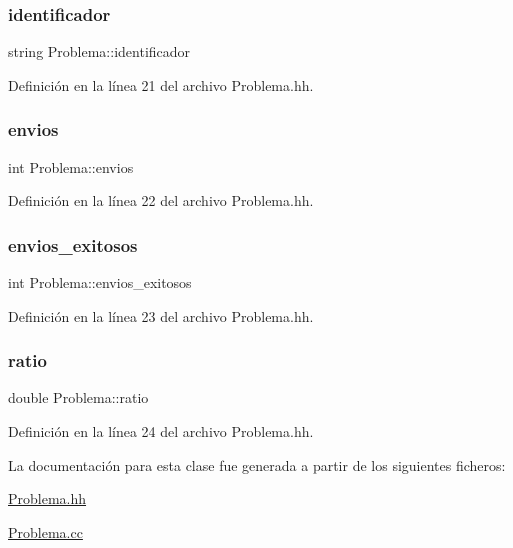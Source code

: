 \subsubsection{\texorpdfstring{identificador}{identificador}}
{\footnotesize\ttfamily string Problema\+::identificador\hspace{0.3cm}{\ttfamily [private]}}



Definición en la línea 21 del archivo Problema.\+hh.

\mbox{\label{class_problema_aaef8dcb723fa829a052517a00aed003e}} 
\subsubsection{\texorpdfstring{envios}{envios}}
{\footnotesize\ttfamily int Problema\+::envios\hspace{0.3cm}{\ttfamily [private]}}



Definición en la línea 22 del archivo Problema.\+hh.

\mbox{\label{class_problema_ad8f0dfd65c2673395ad72ae9817cb7ae}} 
\subsubsection{\texorpdfstring{envios\+\_\+exitosos}{envios\_exitosos}}
{\footnotesize\ttfamily int Problema\+::envios\+\_\+exitosos\hspace{0.3cm}{\ttfamily [private]}}



Definición en la línea 23 del archivo Problema.\+hh.

\mbox{\label{class_problema_acc3d2ce24418ad68650108de4b603d99}} 
\subsubsection{\texorpdfstring{ratio}{ratio}}
{\footnotesize\ttfamily double Problema\+::ratio\hspace{0.3cm}{\ttfamily [private]}}



Definición en la línea 24 del archivo Problema.\+hh.



La documentación para esta clase fue generada a partir de los siguientes ficheros\+:\begin{DoxyCompactItemize}
\item 
\mbox{\hyperlink{_problema_8hh}{Problema.\+hh}}\item 
\mbox{\hyperlink{_problema_8cc}{Problema.\+cc}}\end{DoxyCompactItemize}
